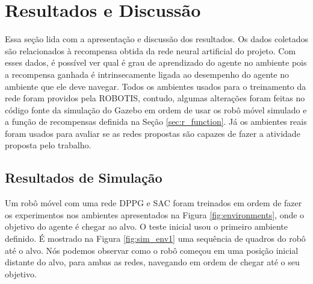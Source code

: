 \chapter{Resultados e Discussão}

Essa seção lida com a apresentação e discussão dos resultados.
Os dados coletados são relacionados à recompensa obtida da rede neural artificial do projeto.
Com esses dados, é possível ver qual é grau de aprendizado do agente no ambiente pois a recompensa ganhada é intrinsecamente ligada ao desempenho do agente no ambiente que ele deve navegar.
Todos os ambientes usados para o treinamento da rede foram providos pela ROBOTIS, contudo, algumas alterações foram feitas no código fonte da simulação do Gazebo em ordem de usar os robô móvel simulado e a função de recompensas definida na Seção \ref{sec:r_function}.
Já os ambientes reais foram usados para avaliar se as redes propostas são capazes de fazer a atividade proposta pelo trabalho.

\section{Resultados de Simulação}

Um robô móvel com uma rede DPPG e SAC foram treinados em ordem de fazer os experimentos nos ambientes apresentados na Figura \ref{fig:environments}, onde o objetivo do agente é chegar ao alvo.
O teste inicial usou o primeiro ambiente definido.
É mostrado na Figura \ref{fig:sim_env1} uma sequência de quadros do robô até o alvo.
Nós podemos observar como o robô começou em uma posição inicial distante do alvo, para ambas as redes, navegando em ordem de chegar até o seu objetivo.

